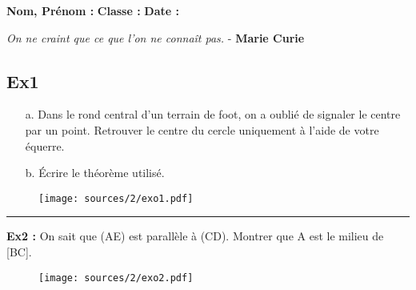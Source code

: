\documentclass[11pt]{article}
\newcommand{\horrule}[1]{\rule{\linewidth}{#1}} %
\newcommand{\Pointille}[1][3]{\multido{}{#1}{ \makebox[\linewidth]{\dotfill}\\[\parskip]}}
\begin{document}

\textbf{Nom, Prénom :} \hspace{8cm} \textbf{Classe :} \hspace{3cm} \textbf{Date :}

\begin{center}
  \textit{On ne craint que ce que l'on ne connaît pas.}  - \textbf{Marie Curie}
\end{center}



\begin{multicols}{2}

  \subsection*{Ex1}

  \begin{itemize}
  \item[a.] Dans le rond central d'un terrain de foot, on a oublié de signaler le centre par un point. Retrouver le centre du cercle uniquement à l'aide de votre équerre.
  \item[b.] Écrire le théorème utilisé.\newline
    \Pointille[6]
  \end{itemize}

  \begin{figure}[H]
    \centering
    \texttt{[image: sources/2/exo1.pdf]}
  \end{figure}
  
\end{multicols}

\horrule{1px}

\begin{multicols}{2}

\textbf{Ex2 :}  On sait que (AE) est parallèle à (CD).\newline
  Montrer que A est le milieu de [BC].
  
  \begin{figure}[H]
    \centering
    \texttt{[image: sources/2/exo2.pdf]}
  \end{figure}

  \Pointille[7]

\end{multicols}
\end{document}
